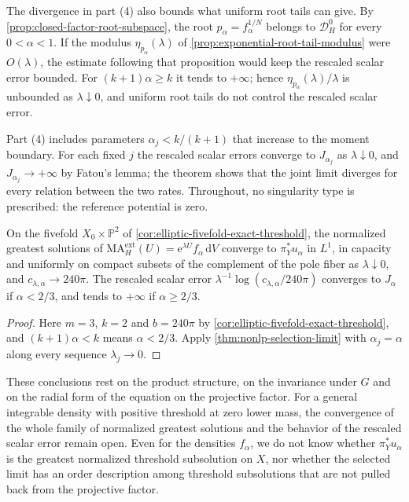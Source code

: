 The divergence in part (4) also bounds what uniform root tails can give. By \cref{prop:closed-factor-root-subspace}, the root $p_\alpha=f_\alpha^{1/N}$ belongs to $\mathcal D_H^0$ for every $0<\alpha<1$. If the modulus $\eta_{p_\alpha}(\lambda)$ of \cref{prop:exponential-root-tail-modulus} were $O(\lambda)$, the estimate following that proposition would keep the rescaled scalar error bounded. For $(k+1)\alpha\geq k$ it tends to $+\infty$; hence $\eta_{p_\alpha}(\lambda)/\lambda$ is unbounded as $\lambda\downarrow0$, and uniform root tails do not control the rescaled scalar error.

Part (4) includes parameters $\alpha_j<k/(k+1)$ that increase to the moment boundary. For each fixed $j$ the rescaled scalar errors converge to $J_{\alpha_j}$ as $\lambda\downarrow0$, and $J_{\alpha_j}\to+\infty$ by Fatou's lemma; the theorem shows that the joint limit diverges for every relation between the two rates. Throughout, no singularity type is prescribed: the reference potential is zero.

\begin{corollary}\label{cor:nonlp-selection-fivefold}
On the fivefold $X_0\times\mathbb P^2$ of \cref{cor:elliptic-fivefold-exact-threshold}, the normalized greatest solutions of $\mathrm{MA}^{\mathrm{ext}}_H(U)=\mathrm{e}^{\lambda U}f_\alpha\,\mathrm{d}V$ converge to $\pi_Y^*u_\alpha$ in $L^1$, in capacity and uniformly on compact subsets of the complement of the pole fiber as $\lambda\downarrow0$, and $c_{\lambda,\alpha}\to240\pi$. The rescaled scalar error $\lambda^{-1}\log(c_{\lambda,\alpha}/240\pi)$ converges to $J_\alpha$ if $\alpha<2/3$, and tends to $+\infty$ if $\alpha\geq2/3$.
\end{corollary}
\begin{proof}
Here $m=3$, $k=2$ and $b=240\pi$ by \cref{cor:elliptic-fivefold-exact-threshold}, and $(k+1)\alpha<k$ means $\alpha<2/3$. Apply \cref{thm:nonlp-selection-limit} with $\alpha_j=\alpha$ along every sequence $\lambda_j\to0$.
\end{proof}

These conclusions rest on the product structure, on the invariance under $G$ and on the radial form of the equation on the projective factor. For a general integrable density with positive threshold at zero lower mass, the convergence of the whole family of normalized greatest solutions and the behavior of the rescaled scalar error remain open. Even for the densities $f_\alpha$, we do not know whether $\pi_Y^*u_\alpha$ is the greatest normalized threshold subsolution on $X$, nor whether the selected limit has an order description among threshold subsolutions that are not pulled back from the projective factor.
